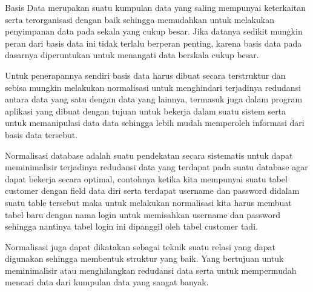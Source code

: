 \documentclass[a4paper,12 pt]{article}
\begin{document}
\newpage
\begin{flushleft}
\title{\textbf{1. Pengenalan Basis Data}\linebreak 
\end{flushleft}
\par Basis Data merupakan suatu kumpulan data yang saling mempunyai keterkaitan serta terorganisasi dengan baik sehingga memudahkan untuk melakukan penyimpanan data pada sekala yang cukup besar. Jika datanya sedikit mungkin peran dari basis data ini tidak terlalu berperan penting, karena basis data pada dasarnya diperuntukan untuk menangati data berskala cukup besar.
\par Untuk penerapannya sendiri basis data harus dibuat secara terstruktur dan sebisa mungkin melakukan normalisasi untuk menghindari terjadinya redudansi antara data yang satu dengan data yang lainnya, termasuk juga dalam program aplikasi yang dibuat dengan tujuan untuk bekerja dalam suatu sistem serta untuk memanipulasi data data sehingga lebih mudah memperoleh informasi dari basis data tersebut.
\newline

\begin{flushleft}
\title{\textbf{2. Normalisasi Database}\linebreak 
\end{flushleft}
\par Normalisasi database adalah suatu pendekatan secara sistematis untuk dapat meminimalisir terjadinya redudansi data yang terdapat pada suatu database agar dapat bekerja secara optimal, contohnya ketika kita mempunyai suatu tabel customer dengan field data diri serta terdapat username dan password didalam suatu table tersebut maka untuk melakukan normalisasi kita harus membuat tabel baru dengan nama login untuk memisahkan username dan password sehingga nantinya tabel login ini dipanggil oleh tabel customer tadi.  
\par Normalisasi juga dapat dikatakan sebagai teknik suatu relasi yang dapat digunakan sehingga membentuk struktur yang baik. Yang bertujuan untuk meminimalisir atau menghilangkan redudansi data serta untuk mempermudah mencari data dari kumpulan data yang sangat banyak.
\newline
\end{document}
